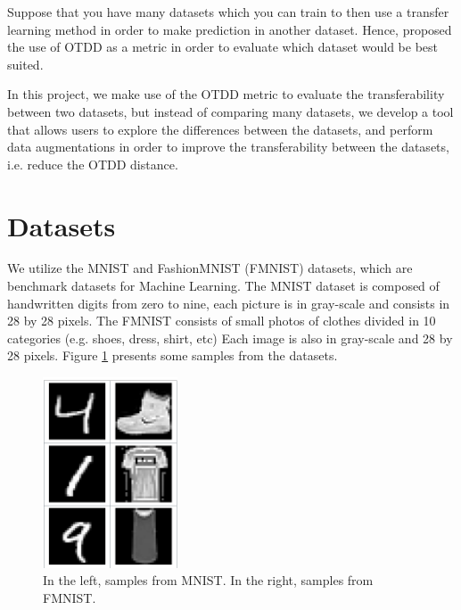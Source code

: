 \documentclass[10pt]{article}
\theoremstyle{definition}
\begin{document}
Suppose that you have many
datasets which you can train to then use a transfer learning method
in order to make prediction in another dataset. Hence,
\citet{alvarez2020geometric} proposed the use of OTDD as a metric
in order to evaluate which dataset would be best suited.

In this project, we make use of the OTDD metric to evaluate
the transferability between two datasets, but instead of
comparing many datasets, we develop a tool that allows users
to explore the differences between the datasets, and perform data
augmentations in order to improve the transferability between the datasets, i.e.
reduce the OTDD distance.

\section{Datasets}

We utilize the MNIST and FashionMNIST (FMNIST) datasets, which are benchmark
datasets for Machine Learning. The MNIST dataset is composed of handwritten
digits from zero to nine, each picture is in gray-scale and consists
in 28 by 28 pixels.
The FMNIST consists of small photos of clothes divided in 10 categories (e.g. shoes, dress, shirt, etc)
Each image is also in gray-scale and 28 by 28 pixels.
Figure \ref{fig:dataset} presents some samples from the datasets.

\begin{figure}[H]
  \centering
  \includegraphics[width=4cm]{Figures/datasets.png}
  \caption{In the left, samples from MNIST. In the right, samples from FMNIST.}
  \label{fig:dataset}
\end{figure}


  
  
\end{document}
